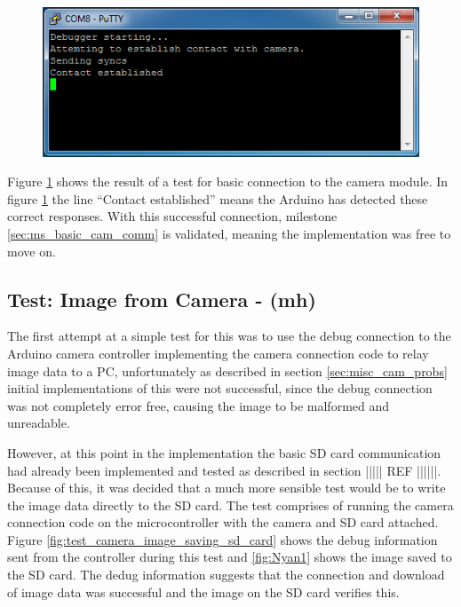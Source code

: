 \begin{figure}[H]
        \centering
        \includegraphics[width=1.0\textwidth]{testing_screenshots/camera_basic_connection_test.png}
        \label{fig:test_basic_connection}
\end{figure}

Figure \ref{fig:test_basic_connection} shows the result of a test for basic connection to the camera module. In figure \ref{fig:test_basic_connection} the line ``Contact established'' means the Arduino has detected these correct responses. With this successful connection, milestone \ref{sec:ms_basic_cam_comm} is validated, meaning the implementation was free to move on.

\subsection{Test: Image from Camera - (mh)}
\label{sec:image_capture_test}

The first attempt at a simple test for this was to use the debug connection to the Arduino camera controller implementing the camera connection code to relay image data to a PC, unfortunately as described in section \ref{sec:misc_cam_probs} initial implementations of this were not successful, since the debug connection was not completely error free, causing the image to be malformed and unreadable.

However, at this point in the implementation the basic SD card communication had already been implemented and tested as described in section ||||| REF ||||||. Because of this, it was decided  that a much more sensible test would be to write the image data directly to the SD card. The test comprises of running the camera connection code on the microcontroller with the camera and SD card attached. Figure \ref{fig:test_camera_image_saving_sd_card} shows the debug information sent from the controller during this test and \ref{fig:Nyan1} shows the image saved to the SD card. The dedug information suggests that the connection and download of image data was successful and the image on the SD card verifies this.

